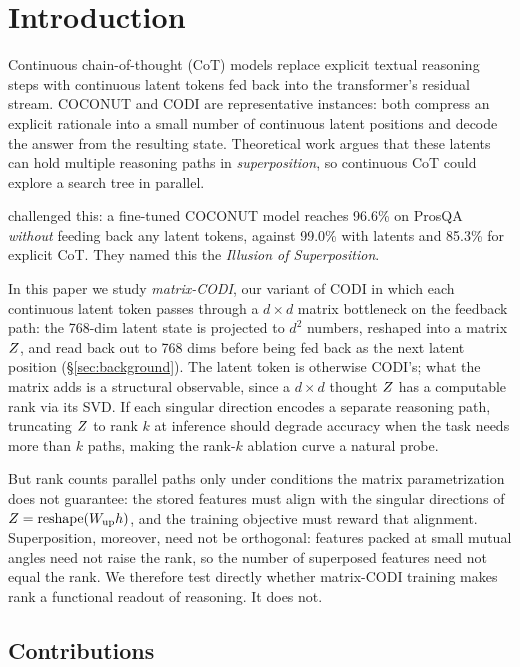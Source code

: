 \section{Introduction}
\label{sec:intro}

Continuous chain-of-thought (CoT) models replace explicit textual
reasoning steps with continuous latent tokens fed back into the
transformer's residual stream. COCONUT \citep{hao2024coconut} and
CODI \citep{shen2025codi} are representative instances: both
compress an explicit rationale into a small number of continuous
latent positions and decode the answer from the resulting state.
Theoretical work \citep{zhu2025superposition,gozeten2025cot2} argues
that these latents can hold multiple reasoning paths in
\emph{superposition}, so continuous CoT could explore a search tree
in parallel.

\citet{rizvi2026illusion} challenged this: a fine-tuned COCONUT model
reaches 96.6\% on ProsQA \emph{without} feeding back any latent
tokens, against 99.0\% with latents and 85.3\% for explicit CoT. They
named this the \emph{Illusion of Superposition}.

In this paper we study \emph{matrix-CODI}, our variant of CODI in
which each continuous latent token passes through a $d\times d$
matrix bottleneck on the feedback path: the 768-dim latent state is
projected to $d^2$ numbers, reshaped into a matrix $Z$, and read
back out to 768 dims before being fed back as the next latent
position (\S\ref{sec:background}). The latent token is otherwise
CODI's; what the matrix adds is a structural observable, since a
$d\times d$ thought $Z$ has a computable rank via its SVD. If each singular direction encodes a separate
reasoning path, truncating $Z$ to rank $k$ at inference should
degrade accuracy when the task needs more than $k$ paths, making
the rank-$k$ ablation curve a natural probe.

But rank counts parallel paths only under conditions the matrix
parametrization does not guarantee: the stored features must align
with the singular directions of $Z=\mathrm{reshape}(W_{\text{up}}h)$,
and the training objective must reward that alignment. Superposition,
moreover, need not be orthogonal: features packed at small mutual
angles need not raise the rank, so the number of superposed features
need not equal the rank. We therefore test directly whether
matrix-CODI training makes rank a functional readout of reasoning. It
does not.

\subsection{Contributions}

